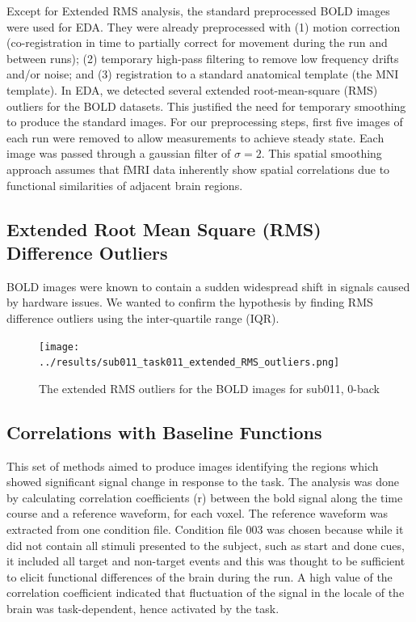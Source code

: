 \documentclass[11pt]{article}
\begin{document}
Except for Extended RMS analysis, the standard preprocessed BOLD images were used for EDA. They were already preprocessed with (1) motion correction (co-registration in time to partially correct for movement during the run and between runs); (2) temporary high-pass filtering to remove low frequency drifts and/or noise; and (3) registration to a standard anatomical template (the MNI template). In EDA, we detected several extended root-mean-square (RMS) outliers for the BOLD datasets. This justified the need for temporary smoothing to produce the standard images. For our preprocessing steps, first five images of each run were removed to allow measurements to achieve steady state. Each image was passed through a gaussian filter of $\sigma=2$. This spatial smoothing approach assumes that fMRI data inherently show spatial correlations due to functional similarities of adjacent brain regions.

\subsection{Extended Root Mean Square (RMS) Difference Outliers}

BOLD images were known to contain a sudden widespread shift in signals caused by hardware issues. We
wanted to confirm the hypothesis by finding RMS difference outliers using the inter-quartile range (IQR).

\begin{figure}[H]
\centering
\texttt{[image: ../results/sub011\_task011\_extended\_RMS\_outliers.png]}
\caption{The extended RMS outliers for the BOLD images for sub011, 0-back}
\end{figure} 

\subsection{Correlations with Baseline Functions}

This set of methods aimed to produce images identifying the regions which showed
significant signal change in response to the task. The analysis was done by calculating 
correlation coefficients (r) between the bold signal along the time course and a reference
waveform, for each voxel. The reference waveform was extracted from one condition file.
Condition file 003 was chosen because while it did not contain all stimuli presented to the
subject, such as start and done cues, it included all target and non-target events and this
was thought to be sufficient to elicit functional differences of the brain during the run. 
A high value of the correlation coefficient indicated that fluctuation of the signal in 
the locale of the brain was task-dependent, hence activated by the task. 
\end{document}
